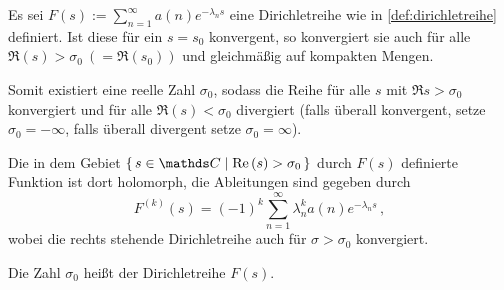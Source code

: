 \begin{satz}\label{satz:konvergenzDirichletreihen}
	Es sei $F(s) := \sum_{n=1}^\infty a(n) e^{-\lambda_n s}$ eine Dirichletreihe wie in \autoref{def:dirichletreihe} definiert.
	Ist diese für ein $s = s_0$ konvergent, so konvergiert sie auch für alle $\Re(s) > \sigma_0\ (= \Re(s_0))$ und gleichmäßig auf kompakten Mengen.
	
	Somit existiert eine reelle Zahl $\sigma_0$, sodass die Reihe für alle $s$ mit $\Re s > \sigma_0$ konvergiert und für alle $\Re(s) < \sigma_0$ divergiert (falls überall konvergent, setze $\sigma_0 = -\infty$, falls überall divergent setze $\sigma_0 = \infty$).
	
	Die in dem Gebiet $\Set{s \in \CC \mid \Re(s) > \sigma_0}$ durch $F(s)$ definierte Funktion ist dort holomorph, die Ableitungen sind gegeben durch
	\[
		F^{(k)}(s) = (-1)^k \sum_{n=1}^\infty \lambda_n^k a(n) e^{-\lambda_n s}\,,
	\]
	wobei die rechts stehende Dirichletreihe auch für $\sigma > \sigma_0$ konvergiert.
	
	Die Zahl $\sigma_0$ heißt  der Dirichletreihe $F(s)$.
\end{satz}

